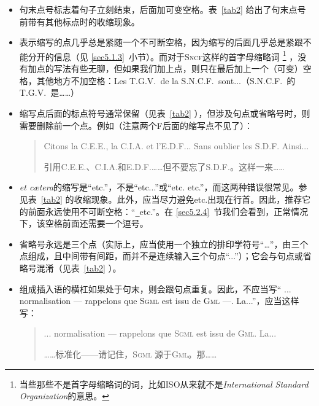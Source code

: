 \begin{itemize}
    \item 句末点号标志着句子立刻结束，后面加可变空格。表~\ref{tab2} 给出了句末点号前带有其他标点时的收缩现象。
    \item 表示缩写的点几乎总是紧随一个不可断空格，因为缩写的后面几乎总是紧跟不能分开的信息（见 \ref{sec5.1.3}~小节）。而对于\textsc{Sncf}这样的首字母缩略词
    \footnote{当些那些不是首字母缩略词的词，比如ISO从来就不是\emph{International Standard Organization}的意思。}
    ，没有加点的写法有些无聊，但如果我们加上点，则只在最后加上一个（可变）空格，其他地方不加空格：Les T.G.V.\verb*| |de la S.N.C.F.\verb*| |sont...（S.N.C.F.\verb*| |的T.G.V.\verb*| |是……）
    \item 缩写点后面的标点符号通常保留（见表~\ref{tab2} ），但涉及句点或省略号时，则需要删除前一个点。例如（注意两个F后面的缩写点不见了）：
    \begin{quote}
        Citons la C.E.E., la C.I.A. et l'E.D.F... Sans oublier les S.D.F. Ainsi...

        \begin{bil}
            引用C.E.E.、C.I.A.和E.D.F.……但不要忘了S.D.F.。这样一来……
        \end{bil}
    \end{quote}
    \item \emph{et cætera}的缩写是``etc.''，不是``etc...''或``etc. etc.''，而这两种错误很常见。参见表~\ref{tab2} 的收缩现象。此外，应当尽力避免etc.出现在行首。因此，推荐它的前面永远使用不可断空格：``\verb|_|etc.''。在 \ref{sec5.2.4}~节我们会看到，正常情况下，该空格前面还需要一个逗号。\label{p33}
    \item 省略号永远是三个点（实际上，应当使用一个独立的排印学符号``…''，由三个点组成，且中间带有间距，而并不是连续输入三个句点``...''）；它会与句点或省略号混淆（见表~\ref{tab2} ）。
    \item 组成插入语的横杠如果处于句末，则会跟句点重复。因此，不应当写`` ... normalisation --- rappelons que \textsc{Sgml} est issu de \textsc{Gml} ---. La...''，应当这样写：
    \begin{quote}
        ... normalisation --- rappelons que \textsc{Sgml} est issu de \textsc{Gml}. La...
        
        \begin{bil}
            ……标准化——请记住，\textsc{Sgml} 源于\textsc{Gml}。那……
        \end{bil}
    \end{quote}
\end{itemize}

